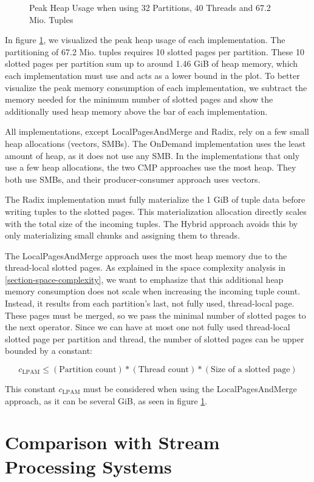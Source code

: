 \begin{figure}[h]
  \centering
  \resizebox{\linewidth}{!}{}
  \caption{Peak Heap Usage when using 32 Partitions, 40 Threads and 67.2 Mio.
    Tuples} \label{plot-heap-16B-P32-Th40} \end{figure} In figure \ref{plot-heap-16B-P32-Th40}, we visualized the peak heap usage of each implementation.
The partitioning of 67.2 Mio.
tuples requires 10 slotted pages per partition.
These 10 slotted pages per partition sum up to around 1.46 GiB of heap memory, which each implementation must use and acts as a lower bound in the plot.
To better visualize the peak memory consumption of each implementation, we subtract the memory needed for the minimum number of slotted pages and show the additionally used heap memory above the bar of each implementation.

All implementations, except LocalPagesAndMerge and Radix, rely on a few small heap allocations (vectors, SMBs).
The OnDemand implementation uses the least amount of heap, as it does not use any \ac{SMB}.
In the implementations that only use a few heap allocations, the two \ac{CMP} approaches use the most heap.
They both use \acp{SMB}, and their producer-consumer approach uses vectors.

The Radix implementation must fully materialize the 1 GiB of tuple data before writing tuples to the slotted pages.
This materialization allocation directly scales with the total size of the incoming tuples.
The Hybrid approach avoids this by only materializing small chunks and assigning them to threads.

The LocalPagesAndMerge approach uses the most heap memory due to the thread-local slotted pages.
As explained in the space complexity analysis in \ref{section-space-complexity}, we want to emphasize that this additional heap memory consumption does not scale when increasing the incoming tuple count.
Instead, it results from each partition's last, not fully used, thread-local page.
These pages must be merged, so we pass the minimal number of slotted pages to the next operator.
Since we can have at most one not fully used thread-local slotted page per partition and thread, the number of slotted pages can be upper bounded by a constant:

\begin{equation} c_\textrm{LPAM} \leq (\textrm{Partition count}) * (\textrm{Thread count}) * (\textrm{Size of a slotted page}) \end{equation}

This constant $c_\textrm{LPAM}$ must be considered when using the LocalPagesAndMerge approach, as it can be several GiB, as seen in figure \ref{plot-heap-16B-P32-Th40}.
\section{Comparison with Stream Processing Systems}
